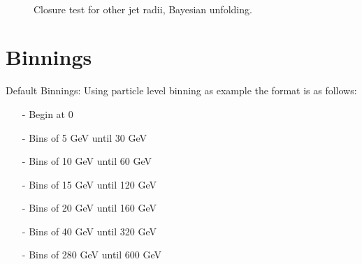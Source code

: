 \newpage 

\begin{figure}[h!]
    \qquad
    \\
    \qquad
    \caption{Closure test for other jet radii, Bayesian unfolding.}
    \label{fig:appendixClosureBayespPb}
\end{figure}

\newpage

\section{Binnings}
\label{sec:appendixSysBinVar}

Default Binnings:
Using particle level binning as example the format is as follows:
\begin{itemize}
    \item[-] Begin at 0
    \item[-] Bins of 5 GeV until 30 GeV
    \item[-] Bins of 10 GeV until 60 GeV
    \item[-] Bins of 15 GeV until 120 GeV
    \item[-] Bins of 20 GeV until 160 GeV
    \item[-] Bins of 40 GeV until 320 GeV
    \item[-] Bins of 280 GeV until 600 GeV
\end{itemize}

